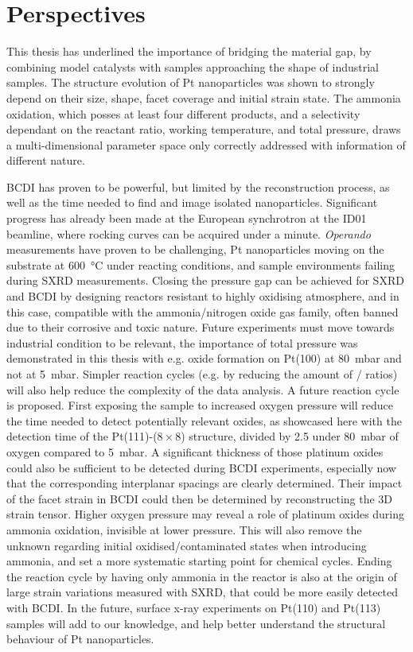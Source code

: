 \section{Perspectives}

This thesis has underlined the importance of bridging the material gap, by combining model catalysts with samples approaching the shape of industrial samples.
The structure evolution of Pt nanoparticles was shown to strongly depend on their size, shape, facet coverage and initial strain state.
The ammonia oxidation, which posses at least four different products, and a selectivity dependant on the reactant ratio, working temperature, and total pressure, draws a multi-dimensional parameter space only correctly addressed with information of different nature.

BCDI has proven to be powerful, but limited by the reconstruction process, as well as the time needed to find and image isolated nanoparticles.
Significant progress has already been made at the European synchrotron at the ID01 beamline, where rocking curves can be acquired under a minute.
\textit{Operando} measurements have proven to be challenging, Pt nanoparticles moving on the substrate at \qty{600}{\degreeCelsius} under reacting conditions, and sample environments failing during SXRD measurements.
Closing the pressure gap can be achieved for SXRD and BCDI by designing reactors resistant to highly oxidising atmosphere, and in this case, compatible with the ammonia/nitrogen oxide gas family, often banned due to their corrosive and toxic nature.
Future experiments must move towards industrial condition to be relevant, the importance of total pressure was demonstrated in this thesis with e.g. oxide formation on Pt(100) at \qty{80}{\milli\bar} and not at \qty{5}{\milli\bar}.
Simpler reaction cycles (e.g. by reducing the amount of / ratios) will also help reduce the complexity of the data analysis.
A future reaction cycle is proposed.
First exposing the sample to increased oxygen pressure will reduce the time needed to detect potentially relevant oxides, as showcased here with the detection time of the Pt(111)-($8\times8$) structure, divided by \num{2.5} under \qty{80}{\milli\bar} of oxygen compared to \qty{5}{\milli\bar}.
A significant thickness of those platinum oxides could also be sufficient to be detected during BCDI experiments, especially now that the corresponding interplanar spacings are clearly determined.
Their impact of the facet strain in BCDI could then be determined by reconstructing the 3D strain tensor.
Higher oxygen pressure may reveal a role of platinum oxides during ammonia oxidation, invisible at lower pressure.
This will also remove the unknown regarding initial oxidised/contaminated states when introducing ammonia, and set a more systematic starting point for chemical cycles.
Ending the reaction cycle by having only ammonia in the reactor is also at the origin of large strain variations measured with SXRD, that could be more easily detected with BCDI.
In the future, surface x-ray experiments on Pt(110) and Pt(113) samples will add to our knowledge, and help better understand the structural behaviour of Pt nanoparticles.

